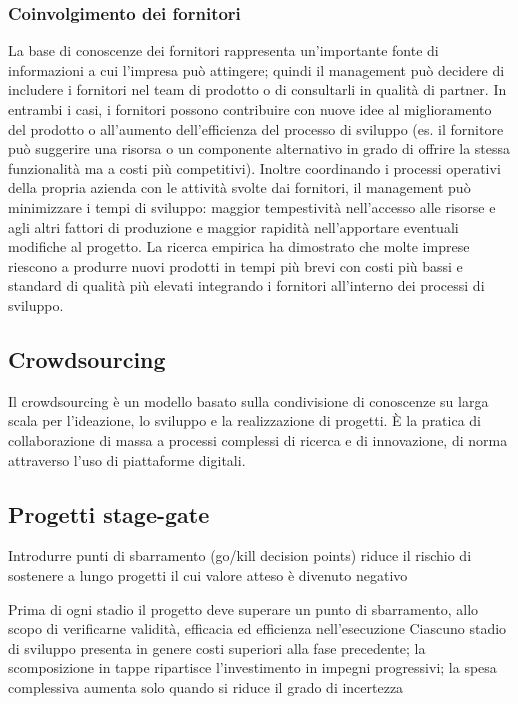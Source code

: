 \documentclass{article}
\begin{document}
\subsubsection{Coinvolgimento dei fornitori}
La base di conoscenze dei fornitori rappresenta un’importante fonte di informazioni a cui
l’impresa può attingere; quindi il management può decidere di includere i fornitori nel team di
prodotto o di consultarli in qualità di partner. In entrambi i casi, i fornitori possono contribuire con
nuove idee al miglioramento del prodotto o all’aumento dell’efficienza del processo di sviluppo
(es. il fornitore può suggerire una risorsa o un componente alternativo in grado di offrire la stessa
funzionalità ma a costi più competitivi). Inoltre coordinando i processi operativi della propria
azienda con le attività svolte dai fornitori, il management può minimizzare i tempi di sviluppo:
maggior tempestività nell’accesso alle risorse e agli altri fattori di produzione e maggior rapidità
nell’apportare eventuali modifiche al progetto.
La ricerca empirica ha dimostrato che molte imprese riescono a produrre nuovi prodotti in tempi
più brevi con costi più bassi e standard di qualità più elevati integrando i fornitori all’interno dei
processi di sviluppo.

\subsection{Crowdsourcing}
Il crowdsourcing è un modello basato sulla condivisione di conoscenze
su larga scala per l’ideazione, lo sviluppo e la realizzazione di progetti.
È la pratica di collaborazione di massa a processi complessi di ricerca e di
innovazione, di norma attraverso l’uso di piattaforme digitali.

\subsection{Progetti stage-gate}
Introdurre punti di sbarramento (go/kill decision points) riduce il rischio di
sostenere a lungo progetti il cui valore atteso è divenuto negativo

Prima di ogni stadio il
progetto deve superare
un punto di
sbarramento, allo scopo
di verificarne validità,
efficacia ed efficienza
nell’esecuzione
Ciascuno stadio di
sviluppo presenta in
genere costi superiori
alla fase precedente; la
scomposizione in tappe
ripartisce l’investimento
in impegni progressivi;
la spesa complessiva
aumenta solo quando si
riduce il grado di
incertezza
\end{document}
